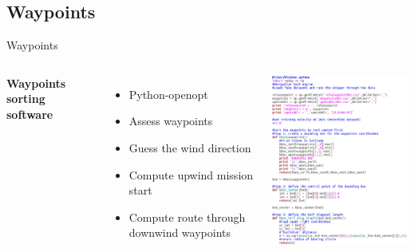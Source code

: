 \documentclass[aspectratio=169,unknownkeysallowed,xcolor=dvipsnames,beamer]{beamer} %
\begin{document}
\subsection{Waypoints}
\begin{frame}[fragile]{Waypoints}
\begin{columns}
\textbf{Waypoints sorting software}
\vspace{5mm}
\begin{itemize}
 \item Python-openopt
 \item Assess waypoints
 \item Guess the wind direction
 \item Compute upwind mission start
 \item Compute route through downwind waypoints
 \end{itemize}
\begin{center}
 \includegraphics[width=8cm]{waypoints_py}
\end{center}
\end{columns}
\end{frame}
\end{document}
